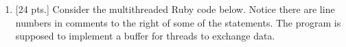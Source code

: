 \documentclass[11pt]{article}
\begin{document}
\begin{enumerate}

          \pagebreak


    \item {[24 pts.]} Consider the multithreaded Ruby code below.  Notice
          there are line numbers in comments to the right of some of the
          statements.  The program is supposed to implement a buffer for
          threads to exchange data.


\end{enumerate}
\end{document}
